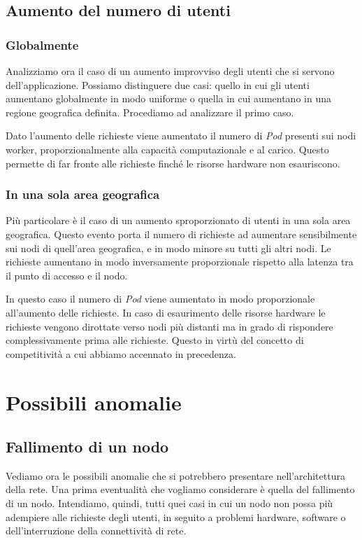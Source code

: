 \documentclass[12pt, hidelinks]{report}
\begin{document}
\subsection{Aumento del numero di utenti}
\subsubsection{Globalmente}
Analizziamo ora il caso di un aumento improvviso degli utenti che si servono dell'applicazione. Possiamo distinguere due casi: quello in cui gli utenti aumentano globalmente in modo uniforme o quella in cui aumentano in una regione geografica definita. Procediamo ad analizzare il primo caso.

Dato l'aumento delle richieste viene aumentato il numero di \textit{Pod} presenti sui nodi worker, proporzionalmente alla capacità computazionale e al carico. Questo permette di far fronte alle richieste finché le risorse hardware non esauriscono.

\subsubsection{In una sola area geografica}
Più particolare è il caso di un aumento sproporzionato di utenti in una sola area geografica. Questo evento porta il numero di richieste ad aumentare sensibilmente sui nodi di quell'area geografica, e in modo minore su tutti gli altri nodi. Le richieste aumentano in modo inversamente proporzionale rispetto alla latenza tra il punto di accesso e il nodo.

In questo caso il numero di \textit{Pod} viene aumentato in modo proporzionale all'aumento delle richieste. In caso di esaurimento delle risorse hardware le richieste vengono dirottate verso nodi più distanti ma in grado di rispondere complessivamente prima alle richieste. Questo in virtù del concetto di competitività a cui abbiamo accennato in precedenza.

\section{Possibili anomalie}

\subsection{Fallimento di un nodo}
Vediamo ora le possibili anomalie che si potrebbero presentare nell'architettura della rete. Una prima eventualità che vogliamo considerare è quella del fallimento di un nodo. Intendiamo, quindi, tutti quei casi in cui un nodo non possa più adempiere alle richieste degli utenti, in seguito a problemi hardware, software o dell'interruzione della connettività di rete. 
\end{document}
